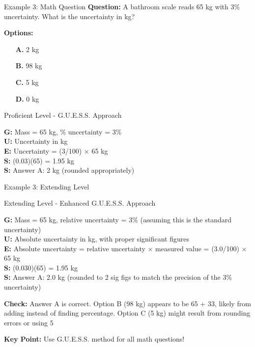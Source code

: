 \documentclass{beamer}
\begin{document}
\begin{frame}{Example 3: Math Question}
\textbf{Question:} A bathroom scale reads 65 kg with 3\% uncertainty. What is the uncertainty in kg?

\textbf{Options:}
\begin{itemize}
\item[\textbf{A.}] 2 kg
\item[\textbf{B.}] 98 kg  
\item[\textbf{C.}] 5 kg
\item[\textbf{D.}] 0 kg
\end{itemize}

\pause
\begin{block}{Proficient Level - G.U.E.S.S. Approach}
\begin{flushleft}
\textbf{G:} Mass = 65 kg, \% uncertainty = 3\% \\
\textbf{U:} Uncertainty in kg \\
\textbf{E:} Uncertainty = (3/100) × 65 kg \\
\textbf{S:} (0.03)(65) = 1.95 kg \\
\textbf{S:} Answer A: 2 kg (rounded appropriately)
\end{flushleft}
\end{block}
\end{frame}

\begin{frame}{Example 3: Extending Level}
\begin{block}{Extending Level - Enhanced G.U.E.S.S. Approach}
\begin{flushleft}
\textbf{G:} Mass = 65 kg, relative uncertainty = 3\% (assuming this is the standard uncertainty) \\
\textbf{U:} Absolute uncertainty in kg, with proper significant figures \\
\textbf{E:} Absolute uncertainty = relative uncertainty × measured value = (3.0/100) × 65 kg \\
\textbf{S:} (0.030)(65) = 1.95 kg \\
\textbf{S:} Answer A: 2.0 kg (rounded to 2 sig figs to match the precision of the 3\% uncertainty)
\end{flushleft}
\textbf{Check:} Answer A is correct. Option B (98 kg) appears to be 65 + 33, likely from adding instead of finding percentage. Option C (5 kg) might result from rounding errors or using 5%
\end{block}

\pause
\textbf{Key Point:} Use G.U.E.S.S. method for all math questions!
\end{frame}
\end{document}
